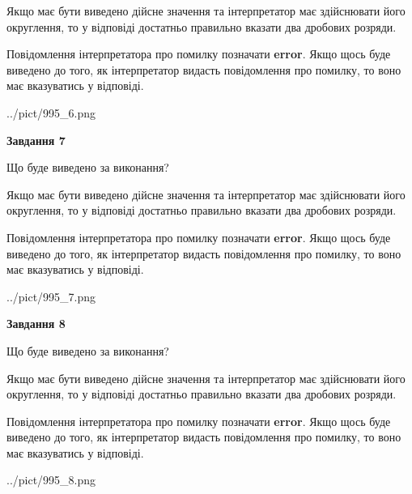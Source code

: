 \documentclass[12pt, ukrainian]{article}
\begin{document}
{\begin {Large}
Якщо має бути виведено дійсне значення та інтерпретатор має здійснювати його округлення, 
то у відповіді достатньо правильно вказати два дробових розряди.

Повідомлення інтерпретатора про помилку позначати \textbf{error}.
Якщо щось буде виведено до того, як інтерпретатор видасть повідомлення про помилку, 
то воно має вказуватись у відповіді. \par

\begin{center}
	{../pict/995_6.png}
\end{center}
\newpage

{\begin {center}\textbf{Завдання 7}\end {center}}\par
Що буде виведено за виконання? \par

Якщо має бути виведено дійсне значення та інтерпретатор має здійснювати його округлення, 
то у відповіді достатньо правильно вказати два дробових розряди.

Повідомлення інтерпретатора про помилку позначати \textbf{error}.
Якщо щось буде виведено до того, як інтерпретатор видасть повідомлення про помилку, 
то воно має вказуватись у відповіді. \par

\begin{center}
	{../pict/995_7.png}
\end{center}
\newpage

{\begin {center}\textbf{Завдання 8}\end {center}}\par
Що буде виведено за виконання? \par

Якщо має бути виведено дійсне значення та інтерпретатор має здійснювати його округлення, 
то у відповіді достатньо правильно вказати два дробових розряди.

Повідомлення інтерпретатора про помилку позначати \textbf{error}.
Якщо щось буде виведено до того, як інтерпретатор видасть повідомлення про помилку, 
то воно має вказуватись у відповіді. \par

\begin{center}
	{../pict/995_8.png}
\end{center}
\newpage


\end{Large}}
\end{document}
